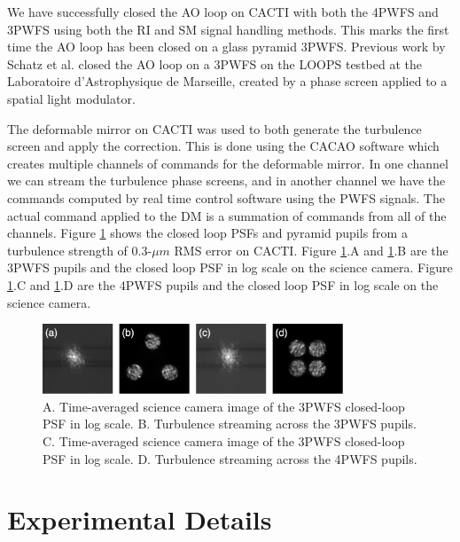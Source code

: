 We have successfully closed the AO loop on CACTI with both the 4PWFS and 3PWFS using both the RI and SM signal handling methods. This marks the first time the AO loop has been closed on a glass pyramid 3PWFS. Previous work by Schatz et al. closed the AO loop on a 3PWFS on the LOOPS testbed at the Laboratoire d'Astrophysique de Marseille, created by a phase screen applied to a spatial light modulator. 


The deformable mirror on CACTI was used to both generate the turbulence screen and apply the correction. This is done using the CACAO software which creates multiple channels of commands for the deformable mirror. In one channel we can stream the turbulence phase screens, and in another channel we have the commands computed by real time control software using the PWFS signals. The actual command applied to the DM is a summation of commands from all of the channels. Figure \ref{fig:turbCACTI} shows the closed loop PSFs and pyramid pupils from a turbulence strength of 0.3-$\mu m$ RMS error on CACTI. Figure \ref{fig:turbCACTI}.A and \ref{fig:turbCACTI}.B are the 3PWFS pupils and the closed loop PSF in log scale on the science camera. Figure \ref{fig:turbCACTI}.C and \ref{fig:turbCACTI}.D are the 4PWFS pupils and the closed loop PSF in log scale on the science camera.


\begin{figure}
    \centering
    \includegraphics[width=0.8\textwidth]{Chapter Materials/Chapter Five Materials/turbCACTI.png}
    \caption{A. Time-averaged science camera image of the 3PWFS closed-loop PSF in log scale. B. Turbulence streaming across the 3PWFS pupils. C. Time-averaged science camera image of the 3PWFS closed-loop PSF in log scale. D. Turbulence streaming across the 4PWFS pupils.}
    \label{fig:turbCACTI}
\end{figure}


\section{Experimental Details}


